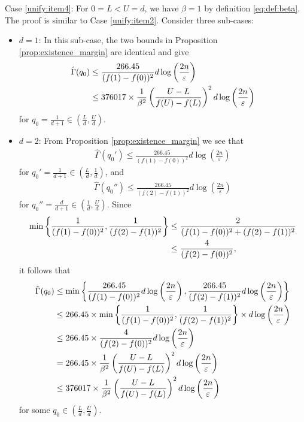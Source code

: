 \documentclass[onecolumn,letterpaper]{IEEEtran}
\newcommand{\cp}{{q}}
\newcommand{\up}{{U}}
\newcommand{\lw}{{L}}
\newcommand{\bet}{{\beta}}
\newcommand{\exifinal}{{ 376017 \times \frac{1}{\bet^2} \left( \frac{\up-\lw}{f(\up)-f(\lw)} \right)^2  d\log \left( \frac{2n}{\varepsilon } \right)}}
\newcommand{\ftaup}{{\hat{\Gamma}}}
\newcommand{\cpns}{\cp_0}
\newcommand{\fTpns}{\ftaup (\cpns)}
\begin{document}
Case \ref{unify:item4}: For $0 = \lw < \up = d$, we have $\bet=1$ by definition \eqref{eq:def:beta}. The proof is similar to Case \ref{unify:item2}. Consider three sub-cases:
\begin{itemize}
\item \underline{$d= 1$}: In this sub-case, the two bounds in Proposition \ref{prop:existence_margin} are identical and give 
    \begin{align}
    \ftaup(\cpns) &\le \frac{266.45}{(f(1)-f(0))^2} d \log \left( \frac{2n}{\varepsilon} \right) \notag\\
    &\le \exifinal
    \end{align}
    for $\cpns=\frac{1}{d+1}\in \left(\frac{\lw}{d},\frac{\up}{d}\right)$.
    
\item \underline{$d= 2$}: From Proposition \ref{prop:existence_margin} we see that
   \begin{align}
    \ftaup(\cpns') \le \frac{266.45}{(f(1)-f(0))^2} d \log \left( \frac{2n}{\varepsilon} \right)
\end{align}
for $\cpns'=\frac 1 {d+1} \in \left(\frac {\lw} d, \frac {1} {d}\right)$, and 
\begin{align}
   \ftaup(\cpns'') \le \frac{266.45}{(f(2)-f(1))^2} d \log \left( \frac{2n}{\varepsilon} \right)
\end{align}
for $\cpns''=\frac {d} {d+1} \in \left(\frac {1} d, \frac {\up} {d}\right)$.
Since
\begin{align}
    \min \left\{ \frac{1}{(f(1)-f(0))^2} , \frac{1}{(f(2)-f(1))^2} \right\}
    &\le\frac{2}{(f(1)-f(0))^2 + (f(2)-f(1))^2} \notag\\
    &\le \frac{4}{(f(2)-f(0))^2},
\end{align}
it follows that 
\begin{align}
    \fTpns &\le \min \left\{ \frac{266.45}{(f(1)-f(0))^2} d \log \left( \frac{2n}{\varepsilon} \right),\frac{266.45}{(f(2)-f(1))^2} d \log \left( \frac{2n}{\varepsilon} \right)\right\} \notag\\
    &\le 266.45 \times \min \left\{ \frac{1}{(f(1)-f(0))^2} , \frac{1}{(f(2)-f(1))^2}\right\} \times d\log \left( \frac{2n}{\varepsilon } \right) \notag\\
    &\leq 266.45 \times \frac{4}{(f(2)-f(0))^2}  d\log \left( \frac{2n}{\varepsilon } \right) \notag\\
    &= 266.45 \times \frac{1}{\bet^2} \left( \frac{\up-\lw}{f(\up)-f(\lw)} \right)^2  d\log \left( \frac{2n}{\varepsilon } \right) \notag\\
    &\le \exifinal 
\end{align}
for some $\cpns \in \left( \frac{\lw}{d} , \frac{\up}{d} \right)$. 
    

\end{itemize}
\end{document}
